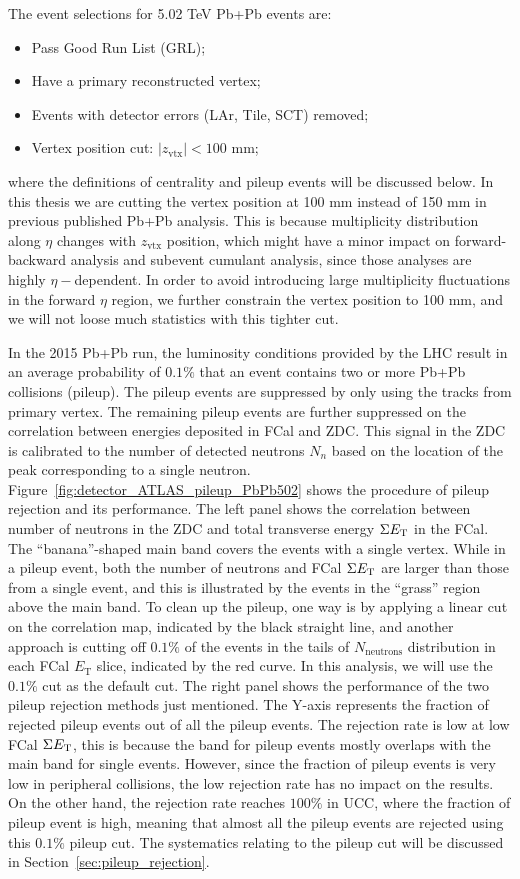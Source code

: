 The event selections for 5.02 TeV Pb+Pb events are:
\begin{itemize}
\item Pass Good Run List (GRL);
\item Have a primary reconstructed vertex;
\item Events with detector errors (LAr, Tile, SCT) removed;
\item Vertex position cut: $|z_\text{vtx}|<100$ mm;
\end{itemize}
where the definitions of centrality and pileup events will be discussed below. In this thesis we are cutting the vertex position at 100 mm instead of 150 mm in previous published Pb+Pb analysis. This is because multiplicity distribution along $\eta$ changes with $z_\text{vtx}$ position, which might have a minor impact on forward-backward analysis and subevent cumulant analysis, since those analyses are highly $\eta-$dependent. In order to avoid introducing large multiplicity fluctuations in the forward $\eta$ region, we further constrain the vertex position to 100 mm, and we will not loose much statistics with this tighter cut.

In the 2015 Pb+Pb run, the luminosity conditions provided by the LHC result in an average probability of $0.1\%$ that an event contains two or more Pb+Pb collisions (pileup). The pileup events are suppressed by only using the tracks from primary vertex. The remaining pileup events are further suppressed on the correlation between energies deposited in FCal and ZDC. This signal in the ZDC is calibrated to the number of detected neutrons $N_n$ based on the location of the peak corresponding to a single neutron. Figure~\ref{fig:detector_ATLAS_pileup_PbPb502} shows the procedure of pileup rejection and its performance. The left panel shows the correlation between number of neutrons in the ZDC and total transverse energy $\Sigma E_\text{T}$ in the FCal. The ``banana''-shaped main band covers the events with a single vertex. While in a pileup event, both the number of neutrons and FCal $\Sigma E_\text{T}$ are larger than those from a single event, and this is illustrated by the events in the ``grass'' region above the main band. To clean up the pileup, one way is by applying a linear cut on the correlation map, indicated by the black straight line, and another approach is cutting off $0.1\%$ of the events in the tails of $N_\text{neutrons}$ distribution in each FCal $E_\text{T}$ slice, indicated by the red curve. In this analysis, we will use the $0.1\%$ cut as the default cut. The right panel shows the performance of the two pileup rejection methods just mentioned. The Y-axis represents the fraction of rejected pileup events out of all the pileup events. The rejection rate is low at low FCal $\Sigma E_\text{T}$, this is because the band for pileup events mostly overlaps with the main band for single events. However, since the fraction of pileup events is very low in peripheral collisions, the low rejection rate has no impact on the results. On the other hand, the rejection rate reaches $100\%$ in UCC, where the fraction of pileup event is high, meaning that almost all the pileup events are rejected using this $0.1\%$ pileup cut. The systematics relating to the pileup cut will be discussed in Section~\ref{sec:pileup_rejection}.


